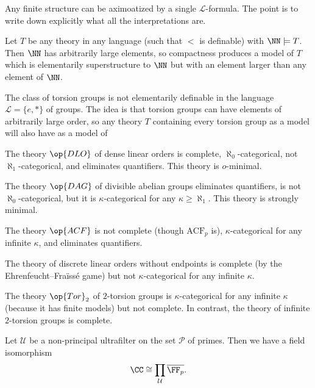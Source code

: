 \documentclass{article}
\begin{document}
\begin{example}
	Any finite structure can be aximoatized by a single $\mathcal L$-formula. The point is to write down explicitly what all the interpretations are.
\end{example}
\begin{example}
	Let $T$ be any theory in any language (such that $<$ is definable) with $\NN\models T$. Then $\NN$ has arbitrarily large elements, so compactness produces a model of $T$ which is elementarily superstructure to $\NN$ but with an element larger than any element of $\NN$.
\end{example}
\begin{example}
	The class of torsion groups is not elementarily definable in the language $\mathcal L=\{e,*\}$ of groups. The idea is that torsion groups can have elements of arbitrarily large order, so any theory $T$ containing every torsion group as a model will also have as a model of 
\end{example}
\begin{example}
	The theory $\op{DLO}$ of dense linear orders is complete, $\aleph_0$-categorical, not $\aleph_1$-categorical, and eliminates quantifiers. This theory is $o$-minimal.
\end{example}
\begin{example}
	The theory $\op{DAG}$ of divisible abelian groups eliminates quantifiers, is not $\aleph_0$-categorical, but it is $\kappa$-categorical for any $\kappa\ge\aleph_1$. This theory is strongly minimal.
\end{example}
\begin{example}
	The theory $\op{ACF}$ is not complete (though $\mathrm{ACF}_p$ is), $\kappa$-categorical for any infinite $\kappa$, and eliminates quantifiers.
\end{example}
\begin{example}
	The theory of discrete linear orders without endpoints is complete (by the Ehrenfeucht--Fra\"iss\'e game) but not $\kappa$-categorical for any infinite $\kappa$.
\end{example}
\begin{example}
	The theory $\op{Tor}_2$ of $2$-torsion groups is $\kappa$-categorical for any infinite $\kappa$ (because it has finite models) but not complete. In contrast, the theory of infinite $2$-torsion groups is complete.
\end{example}
\begin{example}
	Let $\mathcal U$ be a non-principal ultrafilter on the set $\mathcal P$ of primes. Then we have a field isomorphism
	\[\CC\cong\prod_{\mathcal U}\overline{\FF_p}.\]
\end{example}
\end{document}
